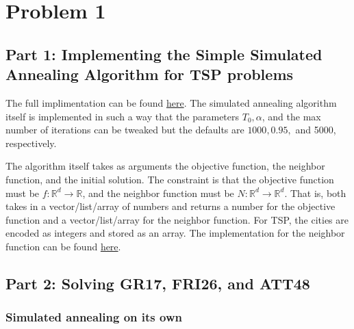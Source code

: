 \section*{Problem 1}

\subsection*{Part 1: Implementing the Simple Simulated Annealing Algorithm for TSP problems}

The full implimentation can be found \href{https://github.com/nngerncham/ma395_heuristic/tree/main/homework/hw2/code/simulated_annealing}{here}. The simulated annealing algorithm itself is implemented in such a way that the parameters \(T_0, \alpha\), and the max number of iterations can be tweaked but the defaults are \(1000, 0.95,\) and 5000, respectively.

The algorithm itself takes as arguments the objective function, the neighbor function, and the initial solution. The constraint is that the objective function must be \(f: \mathbb{R}^d \to \mathbb{R}\), and the neighbor function must be \(N: \mathbb{R}^d \to \mathbb{R}^d\). That is, both takes in a vector/list/array of numbers and returns a number for the objective function and a vector/list/array for the neighbor function. For TSP, the cities are encoded as integers and stored as an array. The implementation for the neighbor function can be found \href{https://github.com/nngerncham/ma395_heuristic/blob/main/homework/hw2/code/simulated_annealing/tsp_neighbors.py}{here}.

\subsection*{Part 2: Solving GR17, FRI26, and ATT48}

\subsubsection*{Simulated annealing on its own}

